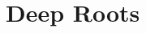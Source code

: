 \documentclass[thesis]{subfiles}
\begin{document}
	
	\chapter{Deep Roots}
	\label{deeproots}
\end{document}
